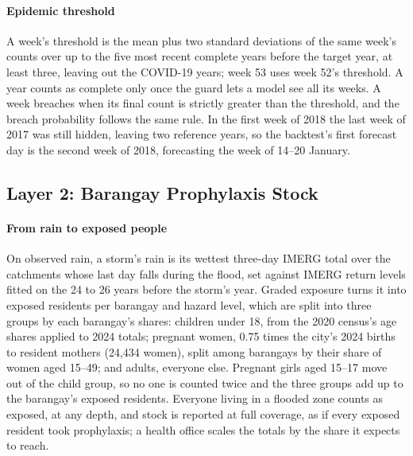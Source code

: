 \paragraph{Epidemic threshold}
A week's threshold is the mean plus two standard deviations of the same week's counts over up to
the five most recent complete years before the target year, at least three, leaving out the
COVID-19 years; week 53 uses week 52's threshold. A year counts as complete only once the guard
lets a model see all its weeks. A week breaches when its final count is strictly greater than the
threshold, and the breach probability follows the same rule. In the first week of 2018 the last
week of 2017 was still hidden, leaving two reference years, so the backtest's first forecast day
is the second week of 2018, forecasting the week of 14--20 January.

\subsection{Layer 2: Barangay Prophylaxis Stock}\label{sec:layer2}

\paragraph{From rain to exposed people}
On observed rain, a storm's rain is its wettest three-day IMERG total over the catchments whose
last day falls during the flood, set against IMERG return levels fitted on the 24 to 26 years
before the storm's year. Graded exposure turns it into exposed residents per barangay and hazard
level, which are split into three groups by each barangay's shares: children under 18, from the
2020 census's age shares applied to 2024 totals; pregnant women, 0.75 times the city's 2024
births to resident mothers (24,434 women), split among barangays by their share of women aged
15--49; and adults, everyone else. Pregnant girls aged 15--17 move out of the child group, so no
one is counted twice and the three groups add up to the barangay's exposed residents. Everyone
living in a flooded zone counts as exposed, at any depth, and stock is reported at full coverage,
as if every exposed resident took prophylaxis; a health office scales the totals by the share it
expects to reach.

